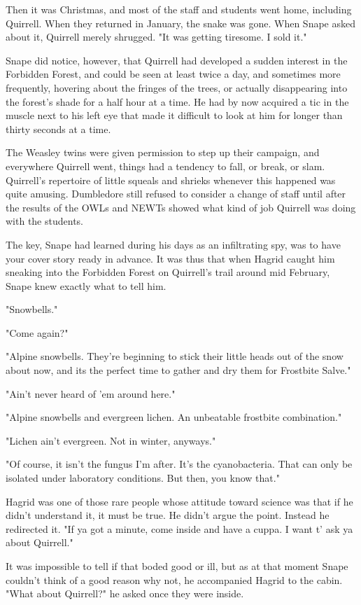 Then it was Christmas, and most of the staff and students went home, including Quirrell. When they returned in January, the snake was gone. When Snape asked about it, Quirrell merely shrugged. "It was getting t{\el}iresome. I s{\el}old it."

Snape did notice, however, that Quirrell had developed a sudden interest in the Forbidden Forest, and could be seen at least twice a day, and sometimes more frequently, hovering about the fringes of the trees, or actually disappearing into the forest's shade for a half hour at a time. He had by now acquired a tic in the muscle next to his left eye that made it difficult to look at him for longer than thirty seconds at a time.

The Weasley twins were given permission to step up their campaign, and everywhere Quirrell went, things had a tendency to fall, or break, or slam. Quirrell's repertoire of little squeals and shrieks whenever this happened was quite amusing. Dumbledore still refused to consider a change of staff until after the results of the OWLs and NEWTs showed what kind of job Quirrell was doing with the students.

The key, Snape had learned during his days as an infiltrating spy, was to have your cover story ready in advance. It was thus that when Hagrid caught him sneaking into the Forbidden Forest on Quirrell's trail around mid February, Snape knew exactly what to tell him.

"Snowbells."

"Come again?"

"Alpine snowbells. They're beginning to stick their little heads out of the snow about now, and its the perfect time to gather and dry them for Frostbite Salve."

"Ain't never heard of 'em around here."

"Alpine snowbells and evergreen lichen. An unbeatable frostbite combination."

"Lichen ain't evergreen. Not in winter, anyways."

"Of course, it isn't the fungus I'm after. It's the cyanobacteria. That can only be isolated under laboratory conditions. But then, you know that."

Hagrid was one of those rare people whose attitude toward science was that if he didn't understand it, it must be true. He didn't argue the point. Instead he redirected it. "If ya got a minute, come inside and have a cuppa. I want t' ask ya about Quirrell."

It was impossible to tell if that boded good or ill, but as at that moment Snape couldn't think of a good reason why not, he accompanied Hagrid to the cabin. "What about Quirrell?" he asked once they were inside.

